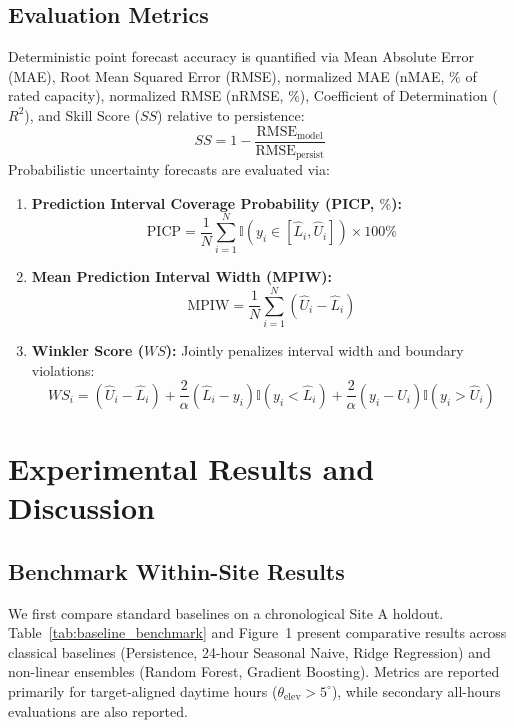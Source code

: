 \documentclass[preprint,12pt,authoryear]{elsarticle}
\begin{document}
\subsection{Evaluation Metrics}
Deterministic point forecast accuracy is quantified via Mean Absolute Error (MAE), Root Mean Squared Error (RMSE), normalized MAE (nMAE, $\%$ of rated capacity), normalized RMSE (nRMSE, $\%$), Coefficient of Determination ($R^2$), and Skill Score ($SS$) relative to persistence:
\begin{equation}
    SS = 1 - \frac{\text{RMSE}_{\text{model}}}{\text{RMSE}_{\text{persist}}}
\end{equation}
Probabilistic uncertainty forecasts are evaluated via:
\begin{enumerate}
    \item \textbf{Prediction Interval Coverage Probability (PICP, $\%$):}
    \begin{equation}
        \text{PICP} = \frac{1}{N} \sum_{i=1}^N \mathbb{I}\left( y_i \in [\hat{L}_i, \hat{U}_i] \right) \times 100\%
    \end{equation}
    \item \textbf{Mean Prediction Interval Width (MPIW):}
    \begin{equation}
        \text{MPIW} = \frac{1}{N} \sum_{i=1}^N (\hat{U}_i - \hat{L}_i)
    \end{equation}
    \item \textbf{Winkler Score ($WS$):} Jointly penalizes interval width and boundary violations:
    \begin{equation}
        WS_i = (\hat{U}_i - \hat{L}_i) + \frac{2}{\alpha}(\hat{L}_i - y_i)\mathbb{I}(y_i < \hat{L}_i) + \frac{2}{\alpha}(y_i - \hat{U}_i)\mathbb{I}(y_i > \hat{U}_i)
    \end{equation}
\end{enumerate}

\section{Experimental Results and Discussion}
\label{sec:results}

\subsection{Benchmark Within-Site Results}
We first compare standard baselines on a chronological Site A holdout. Table~\ref{tab:baseline_benchmark} and Figure~1 present comparative results across classical baselines (Persistence, 24-hour Seasonal Naive, Ridge Regression) and non-linear ensembles (Random Forest, Gradient Boosting). Metrics are reported primarily for target-aligned daytime hours ($\theta_{\text{elev}} > 5^\circ$), while secondary all-hours evaluations are also reported.
\end{document}
